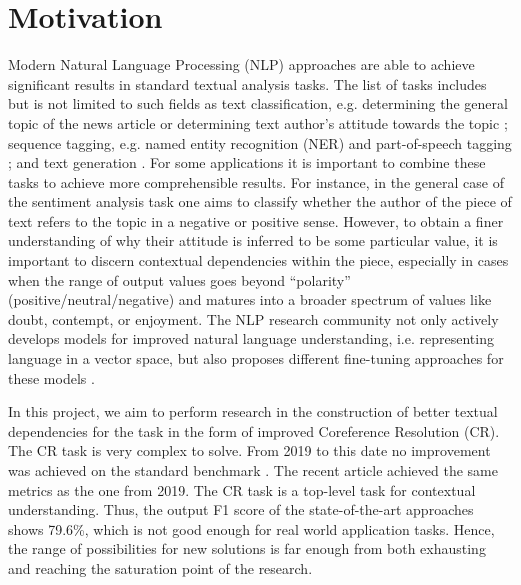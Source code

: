 
\section{Motivation}\label{sec:motication}

Modern Natural Language Processing (NLP) approaches are able to achieve significant results in standard textual analysis tasks. 
The list of tasks includes but is not limited to such fields as text classification, e.g. determining the general topic of the news article \cite{text-classification-Altinel2018} or determining text author's attitude towards the topic \cite{sentiment-analysis-Medhat2014}; sequence tagging,  e.g. named entity recognition (NER)  \cite{ner-Strakova2019,ner-Zhanming2019,ner-Yamada2020,ner-Luoma2020} and part-of-speech tagging \cite{pos-tagging-Bohnet2018}; and text generation \cite{text-gen-Guo2017}. For some applications it is important to combine these tasks to achieve more comprehensible results. 
For instance, in the general case of the sentiment analysis task one aims to classify  whether the author of the piece of text refers to the topic in a negative or positive sense. However, to obtain a finer understanding of why their attitude is inferred to be some particular value, it is important to discern contextual dependencies within the piece, especially in cases when the range of output values goes beyond “polarity” (positive/neutral/negative) and matures into a broader spectrum of values like doubt, contempt, or enjoyment. 
The NLP research community not only actively develops models for improved natural language understanding, i.e. representing language in a vector space, \cite{gpt-Radford2018,bert-Devlin2019,xlnet-Yang2020} but also proposes different fine-tuning approaches for these models \cite{robarta-Liu2019,cr-Joshi2019,gpt2-Radford2019,gpt3-Brown2020}. 

In this project, we aim to perform research in the construction of better textual dependencies for the task in the form of improved Coreference Resolution (CR). 
The CR task is very complex to solve. From 2019 to this date \cite{cr-Joshi2019} no improvement was achieved on the standard benchmark \cite{ontonotes5-Weischedel2013}. 
The recent article \cite{cr-Toshniwal2020} achieved the same metrics as the one from 2019. 
The CR task is a top-level task for contextual understanding. Thus, the output F1 score of the state-of-the-art approaches shows 79.6\%, which is not good enough for real world application tasks. Hence, the range of possibilities for new solutions is far enough from both exhausting and reaching the saturation point of the research.
 
